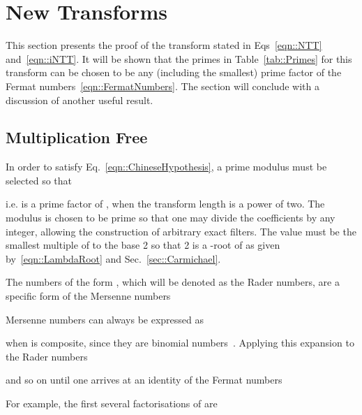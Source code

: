 \documentclass[twocolumn]{IEEEtran}
\newcommand{\eqnTag}{Eq.}
\newcommand{\eqnsTag}{Eqs}
\newcommand{\tabTag}{Table}
\newcommand{\secTag}{Sec.}
\begin{document}
\section{New Transforms}\label{sec::Transforms}
This section presents the proof of the transform stated in \eqnsTag~\eqref{eqn::NTT} and~\eqref{eqn::iNTT}. It will be shown that the primes in \tabTag~\ref{tab::Primes} for this transform can be chosen to be any (including the smallest) prime factor of the Fermat numbers~\eqref{eqn::FermatNumbers}. The section will conclude with a discussion of another useful result.

\subsection{Multiplication Free}
In order to satisfy \eqnTag~\eqref{eqn::ChineseHypothesis}, a prime modulus must be selected so that

i.e.  is a prime factor of , when the transform length  is a power of two. The modulus is chosen to be prime so that one may divide the coefficients by any integer, allowing the construction of arbitrary exact filters. The value  must be the smallest multiple of  to the base 2 so that 2 is a -root of  as given by~\eqref{eqn::LambdaRoot} and \secTag~\ref{sec::Carmichael}.

The numbers of the form , which will be denoted as the Rader numbers, are a specific form of the Mersenne numbers

Mersenne numbers can always be expressed as

when  is composite, since they are binomial numbers~\citep[pg. 42]{Schumer2004}. Applying this expansion to the Rader numbers 

and so on until one arrives at an identity of the Fermat numbers~\citep[pg. 26]{Krizek2001}

For example, the first several factorisations of  are
\end{document}

